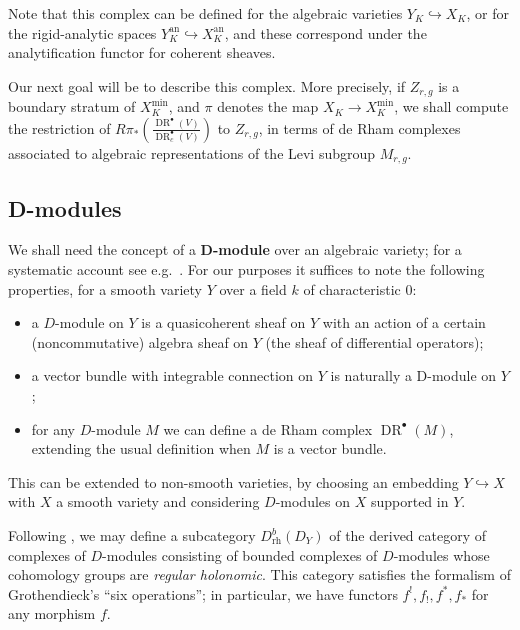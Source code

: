 \documentclass[cjm]{ipart}
\theoremstyle{plain}
\theoremstyle{remark}
\DeclareMathOperator{\DR}{DR}
\newcommand{\into}{\hookrightarrow}
\numberwithin{equation}{subsection}
\begin{document}
  \begin{remark}
   Note that this complex can be defined for the algebraic varieties $Y_K \into X_K$, or for the rigid-analytic spaces $Y_K^{\mathrm{an}} \into X_K^{\mathrm{an}}$, and these correspond under the analytification functor for coherent sheaves.
  \end{remark}

  Our next goal will be to describe this complex. More precisely, if $Z_{r, g}$ is a boundary stratum of $X_K^{\min}$, and $\pi$ denotes the map $X_K \to X_K^{\min}$, we shall compute the restriction of $R\pi_*\left( \frac{\DR^\bullet(V)}{\DR^\bullet_c(V)} \right)$ to $Z_{r, g}$, in terms of de Rham complexes associated to algebraic representations of the Levi subgroup $M_{r, g}$.


 \subsection{D-modules}

  We shall need the concept of a \textbf{D-module} over an algebraic variety; for a systematic account see e.g.~\cite{hotta08}. For our purposes it suffices to note the following properties, for a smooth variety $Y$ over a field $k$ of characteristic 0:
  \begin{itemize}
   \item a $D$-module on $Y$ is a quasicoherent sheaf on $Y$ with an action of a certain (noncommutative) algebra sheaf on $Y$ (the sheaf of differential operators);
   \item a vector bundle with integrable connection on $Y$ is naturally a D-module on $Y$;
   \item for any $D$-module $M$ we can define a de Rham complex $\DR^\bullet(M)$, extending the usual definition when $M$ is a vector bundle.
  \end{itemize}
  This can be extended to non-smooth varieties, by choosing an embedding $Y \into X$ with $X$ a smooth variety and considering $D$-modules on $X$ supported in $Y$.

  Following \cite[\S 6]{hotta08}, we may define a subcategory $D^b_{\mathrm{rh}}(D_Y)$ of the derived category of complexes of $D$-modules consisting of bounded complexes of $D$-modules whose cohomology groups are \emph{regular holonomic}. This category satisfies the formalism of Grothendieck's ``six operations''; in particular, we have functors $f^!, f_!, f^*, f_*$ for any morphism $f$.
\end{document}
